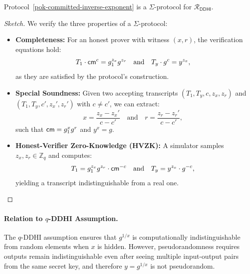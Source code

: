 \begin{theorem}
Protocol~\ref{pok-committed-inverse-exponent} is a $\Sigma$-protocol for $\mathcal{R}_{\mathsf{DDHI}}$.
\end{theorem}

\begin{proof}[Sketch]
We verify the three properties of a $\Sigma$-protocol:

\begin{itemize}
    \item \textbf{Completeness:} For an honest prover with witness $(x, r)$, the verification equations hold:
          $$T_1 \cdot \mathsf{cm}^c = g_1^{z_x} g^{z_r} \quad \text{and} \quad T_y \cdot g^c = y^{z_x},$$
          as they are satisfied by the protocol's construction.
    
    \item \textbf{Special Soundness:} Given two accepting transcripts $(T_1, T_y, c, z_x, z_r)$ and $(T_1, T_y, c', z_x', z_r')$ with $c \neq c'$, we can extract:
          $$x = \frac{z_x - z_x'}{c - c'} \quad \text{and} \quad r = \frac{z_r - z_r'}{c - c'},$$
          such that $\mathsf{cm} = g_1^x g^r$ and $y^x = g$.
    
    \item \textbf{Honest-Verifier Zero-Knowledge (HVZK):} A simulator samples $z_x, z_r \in \mathbb{Z}_q$ and computes:
          $$T_1 = g_1^{z_x} g^{z_r} \cdot \mathsf{cm}^{-c} \quad \text{and} \quad T_y = y^{z_x} \cdot g^{-c},$$
          yielding a transcript indistinguishable from a real one.
\end{itemize}
\end{proof}

\paragraph{Relation to $q$-DDHI Assumption.}  The $q$-DDHI assumption ensures that $g^{1/x}$ is computationally indistinguishable from random elements when $x$ is hidden. However, pseudorandomness requires outputs remain indistinguishable even after seeing multiple input-output pairs from the same secret key, and therefore $y = g^{1/x}$ is not pseudorandom.


















